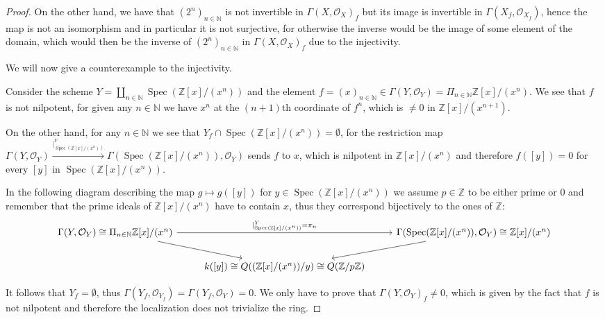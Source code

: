 \documentclass{article}
\newcommand{\numberset}{\mathbb}
\newcommand{\N}{\numberset{N}}
\newcommand{\Z}{\numberset{Z}}
\DeclareMathOperator{\Spec}{Spec}
\begin{document}
\begin{proof}
    On the other hand, we have that $(2^n)_{n\in\N}$ is not invertible in
    $\Gamma(X,\mathcal{O}_X)_f$ but its image is invertible in
    $\Gamma(X_f,\mathcal{O}_{X_f})$, hence the map is not an isomorphism and
    in particular it is not surjective, for otherwise the inverse would be
    the image of some element of the domain, which would then be the inverse
    of $(2^n)_{n\in\N}$ in $\Gamma(X,\mathcal{O}_X)_f$ due to the
    injectivity.
	
    We will now give a counterexample to the injectivity.
	
    Consider the scheme $Y=\amalg_{n\in\N}\Spec(\Z[x]/(x^n))$ and the
    element
    $f=(x)_{n\in\N}\in\Gamma(Y,\mathcal{O}_Y)=\Pi_{n\in\N}\Z[x]/(x^n)$. We
    see that $f$ is not nilpotent, for given any $n\in\N$ we have $x^n$ at
    the $(n+1)$th coordinate of $f^n$, which is $\neq 0$ in
    $\Z[x]/(x^{n+1})$.
	
    On the other hand, for any $n\in\N$ we see that
    $Y_f\cap\Spec(\Z[x]/(x^n))=\emptyset$, for the restriction map
    $\Gamma(Y,\mathcal{O}_Y)\xrightarrow{|^Y_{\Spec(\Z[x]/(x^n))}}\Gamma(\Spec(\Z[x]/(x^n)),\mathcal{O}_Y)$
    sends $f$ to $x$, which is nilpotent in $\Z[x]/(x^n)$ and therefore
    $f([y])=0$ for every $[y]$ in $\Spec(\Z[x]/(x^n))$.
	
    In the following diagram describing the map $g\mapsto g([y])$ for
    $y\in\Spec(\Z[x]/(x^n))$ we assume $p\in\Z$ to be either prime or 0 and
    remember that the prime ideals of $\Z[x]/(x^n)$ have to contain $x$,
    thus they correspond bijectively to the ones of $\Z$:
    \[
	\begin{tikzcd}
		\Gamma(Y,\mathcal{O}_Y)\cong\Pi_{n\in\N}\Z[x]/(x^n)\arrow{rr}{|^Y_{\Spec(\Z[x]/(x^n))}=\pi_n}\arrow{dr}
		&& \Gamma(\Spec(\Z[x]/(x^n)),\mathcal{O}_Y)\cong\Z[x]/(x^n)\arrow{dl} \\
		& k([y])\cong Q((\Z[x]/(x^n))/y)\cong Q(\Z/p\Z)
	\end{tikzcd}
    \]
	
    It follows that $Y_f=\emptyset$, thus
    $\Gamma(Y_f,\mathcal{O}_{Y_f})=\Gamma(Y_f,\mathcal{O}_Y)=0$. We only
    have to prove that $\Gamma(Y,\mathcal{O}_Y)_f\neq 0$, which is given by
    the fact that $f$ is not nilpotent and therefore the localization does
    not trivialize the ring.
\end{proof}

\printbibliography
\end{document}
